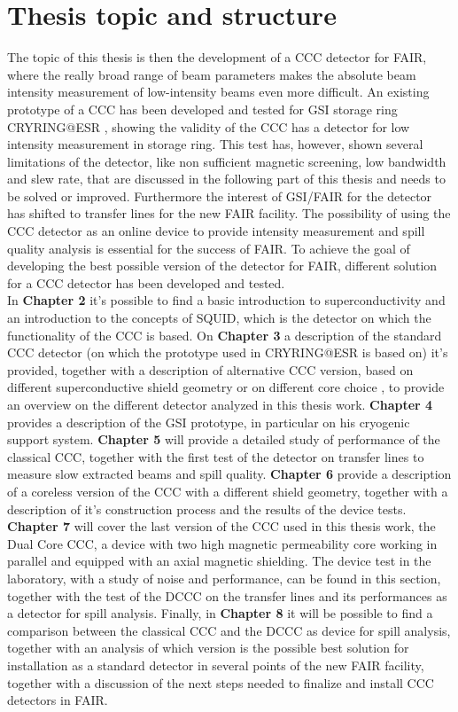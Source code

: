\documentclass[12pt,a4paper]{report}
\begin{document}
	\section{Thesis topic and structure}
	The topic of this thesis is then the development of a CCC detector for FAIR, where the really broad range of beam parameters makes the absolute beam intensity measurement of low-intensity beams even more difficult. An existing prototype of a CCC has been developed and tested for GSI storage ring CRYRING@ESR \cite{DavidThesis}, showing the validity of the CCC has a detector for low intensity measurement in storage ring. This test has, however, shown several limitations of the detector, like non sufficient magnetic screening, low bandwidth and slew rate, that are discussed in the following part of this thesis and needs to be solved or improved. Furthermore the interest of GSI/FAIR for the detector has shifted to transfer lines for the new FAIR facility. The possibility of using the CCC detector as an online device to provide intensity measurement and spill quality analysis is essential for the success of FAIR. To achieve the goal of developing the best possible version of the detector for FAIR, different solution for a CCC detector has been developed and tested. \\
	In \textbf{Chapter 2} it's possible to find a basic introduction to superconductivity and an introduction to the concepts of SQUID, which is the detector on which the functionality of the CCC is based. On \textbf{Chapter 3} a description of the standard CCC detector (on which the prototype used in CRYRING@ESR is based on) it's provided, together with a description of alternative CCC version, based on different superconductive shield \cite{Marsic} geometry or on different core choice \cite{CorelessCCC}, to provide an overview on the different detector analyzed in this thesis work. \textbf{Chapter 4} provides a description of the GSI prototype, in particular on his cryogenic support system. \textbf{Chapter 5} will provide a detailed study of performance of the classical CCC, together with the first test of the detector on transfer lines to measure slow extracted beams and spill quality. \textbf{Chapter 6} provide a description of a coreless version of the CCC with a different shield geometry, together with a description of it's construction process and the results of the device tests. \textbf{Chapter 7} will cover the last version of the CCC used in this thesis work, the Dual Core CCC, a device with two high magnetic permeability core working in parallel and equipped with an axial magnetic shielding. The device test in the laboratory, with a study of noise and performance, can be found in this section, together with the test of the DCCC on the transfer lines and its performances as a detector for spill analysis. Finally, in \textbf{Chapter 8} it will be possible to find a comparison between the classical CCC and the DCCC as device for spill analysis, together with an analysis of which version is the possible best solution for installation as a standard detector in several points of the new FAIR facility, together with a discussion of the next steps needed to finalize and install CCC detectors in FAIR. \\
	 
\end{document}
